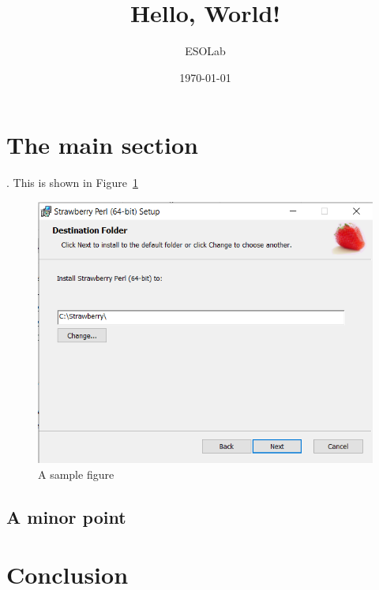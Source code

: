 \documentclass[letter]{article}
\title{Hello, World!}
\author{ESOLab}
\date{\today}
\begin{document}
\maketitle

\section{The main section}

\lipsum[1]. This is shown in Figure~\ref{fig:1}

\begin{figure}[h!]
    \centering
    \includegraphics[width=0.25\linewidth]{image_001.png}
    \caption{A sample figure}
    \label{fig:1}
\end{figure}


\subsection{A minor point}

\lipsum[4]

\section{Conclusion}

\lipsum[5]
\end{document}
